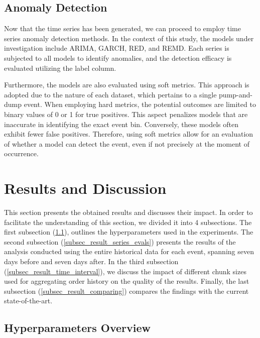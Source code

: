 \documentclass[12pt]{article}
\begin{document}
    \subsection{Anomaly Detection}
	\label{subsec_met_anomaly_detection}

    Now that the time series has been generated, we can proceed to employ time series anomaly detection methods.
    In the context of this study, the models under investigation include ARIMA, GARCH, RED, and REMD.
    Each series is subjected to all models to identify anomalies, and the detection efficacy is evaluated utilizing the label column.

    Furthermore, the models are also evaluated using soft metrics.
    This approach is adopted due to the nature of each dataset, which pertains to a single pump-and-dump event.
    When employing hard metrics, the potential outcomes are limited to binary values of 0 or 1 for true positives.
    This aspect penalizes models that are inaccurate in identifying the exact event bin.
    Conversely, these models often exhibit fewer false positives.
    Therefore, using soft metrics allow for an evaluation of whether a model can detect the event, even if not precisely at the moment of occurrence.
	
	\section{Results and Discussion}
	\label{sec_aval_exp}

	This section presents the obtained results and discusses their impact.
	In order to facilitate the understanding of this section, we divided it into 4 subsections.
	The first subsection (\ref{subsec_exp_hyperparams}), outlines the hyperparameters used in the experiments.
	The second subsection (\ref{subsec_result_series_evals}) presents the results of the analysis conducted using the entire historical data for each event, spanning seven days before and seven days after.
	In the third subsection (\ref{subsec_result_time_interval}), we discuss the impact of different chunk sizes used for aggregating order history on the quality of the results.
	Finally, the last subsection (\ref{subsec_result_comparing}) compares the findings with the current state-of-the-art.

	\subsection{Hyperparameters Overview}
	\label{subsec_exp_hyperparams}
	
\end{document}
